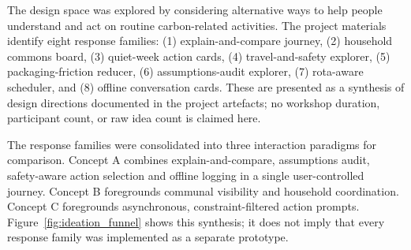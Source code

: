 \documentclass[12pt,a4paper]{article}
\begin{document}
The design space was explored by considering alternative ways to help people understand and act on routine carbon-related activities. The project materials identify eight response families: (1) explain-and-compare journey, (2) household commons board, (3) quiet-week action cards, (4) travel-and-safety explorer, (5) packaging-friction reducer, (6) assumptions-audit explorer, (7) rota-aware scheduler, and (8) offline conversation cards. These are presented as a synthesis of design directions documented in the project artefacts; no workshop duration, participant count, or raw idea count is claimed here.

The response families were consolidated into three interaction paradigms for comparison. Concept A combines explain-and-compare, assumptions audit, safety-aware action selection and offline logging in a single user-controlled journey. Concept B foregrounds communal visibility and household coordination. Concept C foregrounds asynchronous, constraint-filtered action prompts. Figure~\ref{fig:ideation_funnel} shows this synthesis; it does not imply that every response family was implemented as a separate prototype.
\end{document}
